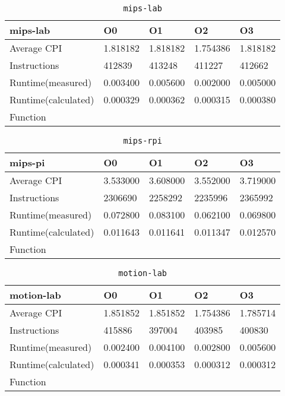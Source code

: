 \begin{table}[ht!]
\centering
\caption{\texttt{mips-lab}}
\label{tab:mips-lab}
\begin{tabular}{|l|l|l|l|l|}
\hline
\textbf{mips-lab}	&	\textbf{O0}	&	\textbf{O1}	&	\textbf{O2}	&	\textbf{O3}	\\\hline\hline
Average CPI	&	1.818182	&	1.818182	&	1.754386	&	1.818182	\\\hline
Instructions	&	412839	&	413248	&	411227	&	412662	\\\hline
Runtime(measured)	&	0.003400	&	0.005600	&	0.002000	&	0.005000	\\\hline
Runtime(calculated)	&	0.000329	&	0.000362	&	0.000315	&	0.000380	\\\hline
Function	&		&		&		&		\\\hline
\end{tabular}
\end{table}
\begin{table}[ht!]
\centering
\caption{\texttt{mips-rpi}}
\label{tab:mips-rpi}
\begin{tabular}{|l|l|l|l|l|}
\hline
\textbf{mips-pi}	&	\textbf{O0}	&	\textbf{O1}	&	\textbf{O2}	&	\textbf{O3}	\\\hline\hline
Average CPI	&	3.533000	&	3.608000	&	3.552000	&	3.719000	\\\hline
Instructions	&	2306690	&	2258292	&	2235996	&	2365992	\\\hline
Runtime(measured)	&	0.072800	&	0.083100	&	0.062100	&	0.069800	\\\hline
Runtime(calculated)	&	0.011643	&	0.011641	&	0.011347	&	0.012570	\\\hline
Function	&		&		&		&		\\\hline
\end{tabular}
\end{table}
\begin{table}[ht!]
\centering
\caption{\texttt{motion-lab}}
\label{tab:motion-lab}
\begin{tabular}{|l|l|l|l|l|}
\hline
\textbf{motion-lab}	&	\textbf{O0}	&	\textbf{O1}	&	\textbf{O2}	&	\textbf{O3}	\\\hline\hline
Average CPI	&	1.851852	&	1.851852	&	1.754386	&	1.785714	\\\hline
Instructions	&	415886	&	397004	&	403985	&	400830	\\\hline
Runtime(measured)	&	0.002400	&	0.004100	&	0.002800	&	0.005600	\\\hline
Runtime(calculated)	&	0.000341	&	0.000353	&	0.000312	&	0.000312	\\\hline
Function	&		&		&		&		\\\hline
\end{tabular}
\end{table}
